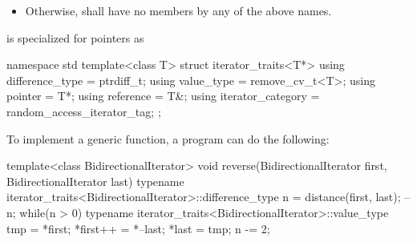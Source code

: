 \begin{itemize}

\item
Otherwise, 
shall have no members by any of the above names.
\end{itemize}

\pnum
{} is specialized for pointers as

\begin{codeblock}
namespace std {
  template<class T> struct iterator_traits<T*> {
    using difference_type   = ptrdiff_t;
    using value_type        = remove_cv_t<T>;
    using pointer           = T*;
    using reference         = T&;
    using iterator_category = random_access_iterator_tag;
  };
}
\end{codeblock}

\pnum
\begin{example}
To implement a generic
function, a \Cpp{} program can do the following:

\begin{codeblock}
template<class BidirectionalIterator>
void reverse(BidirectionalIterator first, BidirectionalIterator last) {
  typename iterator_traits<BidirectionalIterator>::difference_type n =
    distance(first, last);
  --n;
  while(n > 0) {
    typename iterator_traits<BidirectionalIterator>::value_type
     tmp = *first;
    *first++ = *--last;
    *last = tmp;
    n -= 2;
  }
}
\end{codeblock}
\end{example}








